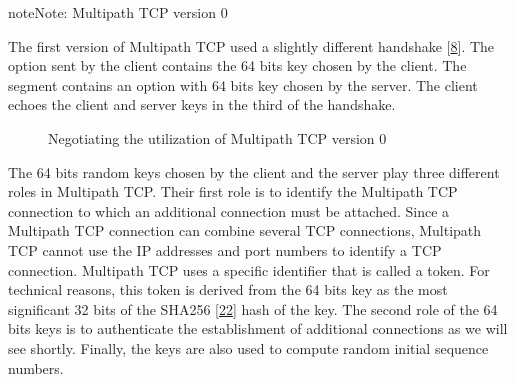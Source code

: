 \documentclass[letterpaper,10pt,english]{sphinxmanual}
\begin{document}
\begin{sphinxadmonition}{note}{Note:}
\sphinxAtStartPar
Multipath TCP version 0

\sphinxAtStartPar
The first version of Multipath TCP used a slightly different handshake {[}\hyperlink{cite.biblio:id6658}{8}{]}. The  option sent by the client contains the 64 bits key chosen by the client. The  segment contains an  option with 64 bits key chosen by the server. The client echoes the client and server keys in the third  of the handshake.
\begin{figure}[H]\centering\capstart{}\caption{Negotiating the utilization of Multipath TCP version 0}\label{\detokenize{mptcp:id64}}\label{\detokenize{mptcp:fig-tcp-handshake-mptcp-v0}}\end{figure}\end{sphinxadmonition}

\sphinxAtStartPar
The 64 bits random keys chosen by the client and the server play three different roles in Multipath TCP. Their first role is to identify the Multipath TCP connection to which an additional connection must be attached. Since a Multipath TCP connection can combine several TCP connections, Multipath TCP cannot use the IP addresses and port numbers to identify a TCP connection. Multipath TCP uses a specific identifier that is called a token. For technical reasons, this token is derived from the 64 bits key as the most significant 32 bits of the SHA\sphinxhyphen{}256 {[}\hyperlink{cite.biblio:id6083}{22}{]} hash of the key. The second role of the 64 bits keys is to authenticate the establishment of additional connections as we will see shortly. Finally, the keys are also used to compute random initial sequence numbers.
\end{document}
